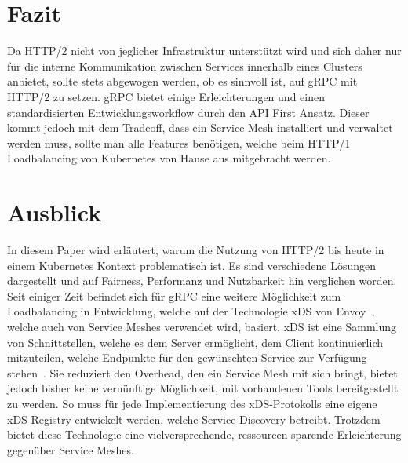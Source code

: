 \documentclass[a4paper,12pt]{article}
\begin{document}
    \section{Fazit}\label{sec:fazit}

    Da HTTP/2 nicht von jeglicher Infrastruktur unterstützt wird und sich daher nur für die interne Kommunikation zwischen Services innerhalb eines Clusters anbietet, sollte stets abgewogen werden, ob es sinnvoll ist, auf gRPC mit HTTP/2 zu setzen.
    gRPC bietet einige Erleichterungen und einen standardisierten Entwicklungsworkflow durch den API First Ansatz.
    Dieser kommt jedoch mit dem Tradeoff, dass ein Service Mesh installiert und verwaltet werden muss, sollte man alle Features benötigen, welche beim HTTP/1 Loadbalancing von Kubernetes von Hause aus mitgebracht werden.

    \newpage


    \section{Ausblick}\label{sec:ausblick}

    In diesem Paper wird erläutert, warum die Nutzung von HTTP/2 bis heute in einem Kubernetes Kontext problematisch ist.
    Es sind verschiedene Lösungen dargestellt und auf Fairness, Performanz und Nutzbarkeit hin verglichen worden.
    Seit einiger Zeit befindet sich für gRPC eine weitere Möglichkeit zum Loadbalancing in Entwicklung, welche auf der Technologie xDS von Envoy~\cite{xds}, welche auch von Service Meshes verwendet wird, basiert.
    xDS ist eine Sammlung von Schnittstellen, welche es dem Server ermöglicht, dem Client kontinuierlich mitzuteilen, welche Endpunkte für den gewünschten Service zur Verfügung stehen~\cite{xds}.
    Sie reduziert den Overhead, den ein Service Mesh mit sich bringt, bietet jedoch bisher keine vernünftige Möglichkeit, mit vorhandenen Tools bereitgestellt zu werden.
    So muss für jede Implementierung des xDS-Protokolls eine eigene xDS-Registry entwickelt werden, welche Service Discovery betreibt.
    Trotzdem bietet diese Technologie eine vielversprechende, ressourcen sparende Erleichterung gegenüber Service Meshes.

    \appendix

    \newpage

    
    
\end{document}
